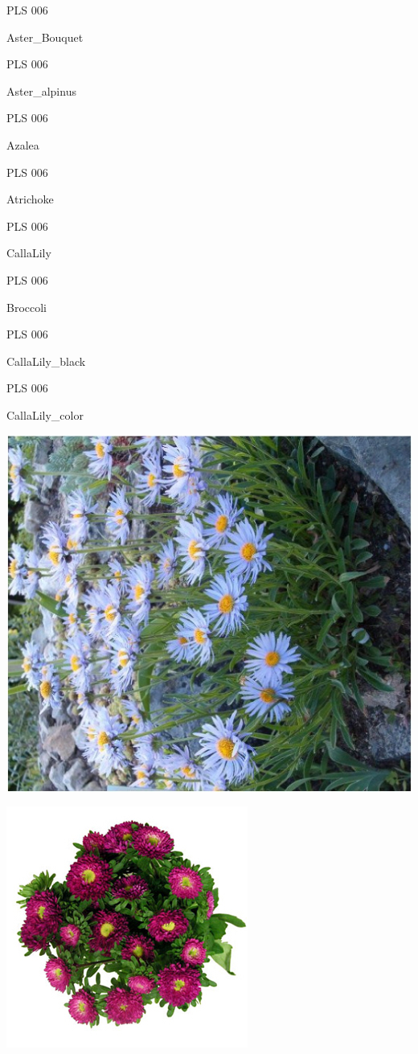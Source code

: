 \documentclass{article}
\begin{document}
\noindent  PLS 006
\vfill
\centerline{{\huge Aster\_Bouquet }}
\vfill
\newpage

\noindent  PLS 006
\vfill
\centerline{{\huge Aster\_alpinus }}
\vfill
\newpage

\noindent  PLS 006
\vfill
\centerline{{\huge Azalea }}
\vfill
\newpage

\noindent  PLS 006
\vfill
\centerline{{\huge Atrichoke }}
\vfill
\newpage

\noindent  PLS 006
\vfill
\centerline{{\huge CallaLily }}
\vfill
\newpage

\noindent  PLS 006
\vfill
\centerline{{\huge Broccoli }}
\vfill
\newpage

\noindent  PLS 006
\vfill
\centerline{{\huge CallaLily\_black }}
\vfill
\newpage

\noindent  PLS 006
\vfill
\centerline{{\huge CallaLily\_color }}
\vfill
\newpage

\begin{center}
\includegraphics[height=0.925\paperheight]{../Aster_alpinus.jpg}
\end{center}
\newpage

\begin{center}
\includegraphics[height=0.925\paperheight]{../Aster_Bouquet.jpg}
\end{center}
\newpage
\end{document}
